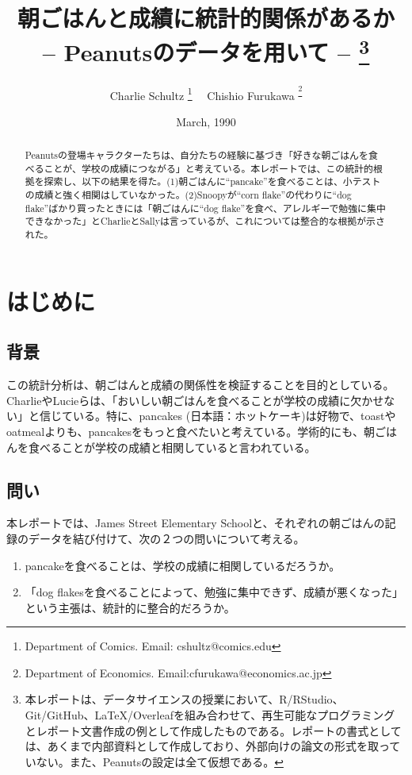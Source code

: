 \documentclass[xelatex,ja=standard]{bxjsarticle}
\title{朝ごはんと成績に統計的関係があるか \\ -- Peanutsのデータを用いて -- \thanks{本レポートは、データサイエンスの授業において、R/RStudio、Git/GitHub、LaTeX/Overleafを組み合わせて、再生可能なプログラミングとレポート文書作成の例として作成したものである。レポートの書式としては、あくまで内部資料として作成しており、外部向けの論文の形式を取っていない。また、Peanutsの設定は全て仮想である。}}
\author{Charlie Schultz
\thanks{Department of Comics. Email: cshultz@comics.edu}  \ \  Chishio Furukawa
\textsuperscript\thanks{Department of Economics. Email:cfurukawa@economics.ac.jp}}
\date{March, 1990}
\begin{document}
\renewcommand\footnotelayout{\small}
\sffamily\mdseries

\maketitle

\vspace{-10pt}\begin{abstract}
\begin{spacing}{1}
\noindent 
Peanutsの登場キャラクターたちは、自分たちの経験に基づき「好きな朝ごはんを食べることが、学校の成績につながる」と考えている。本レポートでは、この統計的根拠を探索し、以下の結果を得た。(1)朝ごはんに``pancake''を食べることは、小テストの成績と強く相関はしていなかった。(2)Snoopyが``corn flake''の代わりに``dog flake''ばかり買ったときには「朝ごはんに``dog flake''を食べ、アレルギーで勉強に集中できなかった」とCharlieとSallyは言っているが、これについては整合的な根拠が示された。\\

\end{spacing}
\end{abstract}

\newpage

\section{はじめに}

\subsection{背景} 

この統計分析は、朝ごはんと成績の関係性を検証することを目的としている。CharlieやLucieらは、「おいしい朝ごはんを食べることが学校の成績に欠かせない」と信じている。特に、pancakes (日本語：ホットケーキ)は好物で\citep{peanutsbook}、toastやoatmealよりも、pancakesをもっと食べたいと考えている。学術的にも、朝ごはんを食べることが学校の成績と相関していると言われている\citep{Chandler1995}。

\subsection{問い}

本レポートでは、James Street Elementary Schoolと、それぞれの朝ごはんの記録のデータを結び付けて、次の２つの問いについて考える。

\begin{enumerate}
\item pancakeを食べることは、学校の成績に相関しているだろうか。
\item 「dog flakesを食べることによって、勉強に集中できず、成績が悪くなった」という主張は、統計的に整合的だろうか。
\end{enumerate}
\end{document}
